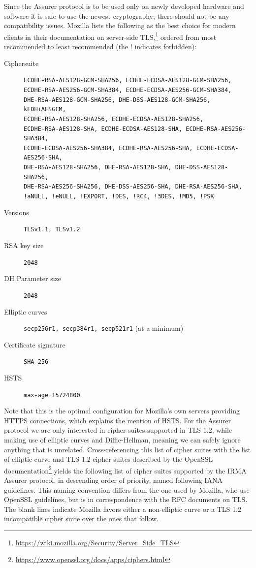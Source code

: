 Since the Assurer protocol is to be used only on newly developed hardware and software it is safe to use the newest cryptography; there should not be any compatibility issues. Mozilla lists the following as the best choice for modern clients in their documentation on server-side TLS,\footnote{\url{https://wiki.mozilla.org/Security/Server_Side_TLS}} ordered from most recommended to least recommended (the $!$ indicates forbidden):

\begin{description}
	\item [Ciphersuite] \texttt{ECDHE-RSA-AES128-GCM-SHA256, ECDHE-ECDSA-AES128-GCM-SHA256, \\
ECDHE-RSA-AES256-GCM-SHA384, ECDHE-ECDSA-AES256-GCM-SHA384, \\
DHE-RSA-AES128-GCM-SHA256, DHE-DSS-AES128-GCM-SHA256, kEDH+AESGCM, \\
ECDHE-RSA-AES128-SHA256, ECDHE-ECDSA-AES128-SHA256, \\
ECDHE-RSA-AES128-SHA, ECDHE-ECDSA-AES128-SHA, ECDHE-RSA-AES256-SHA384, \\
ECDHE-ECDSA-AES256-SHA384, ECDHE-RSA-AES256-SHA, ECDHE-ECDSA-AES256-SHA, \\
DHE-RSA-AES128-SHA256, DHE-RSA-AES128-SHA, DHE-DSS-AES128-SHA256, \\
DHE-RSA-AES256-SHA256, DHE-DSS-AES256-SHA, DHE-RSA-AES256-SHA, \\
!aNULL, !eNULL, !EXPORT, !DES, !RC4, !3DES, !MD5, !PSK}
  \item [Versions] \texttt{TLSv1.1, TLSv1.2}
  \item [RSA key size] \texttt{2048}
  \item [DH Parameter size] \texttt{2048}
  \item [Elliptic curves] \texttt{secp256r1, secp384r1, secp521r1} (at a minimum)
  \item [Certificate signature] \texttt{SHA-256}
  \item [HSTS] \texttt{max-age=15724800}
\end{description}

Note that this is the optimal configuration for Mozilla's own servers providing HTTPS connections, which explains the mention of HSTS. For the Assurer protocol we are only interested in cipher suites supported in TLS 1.2, while making use of elliptic curves and Diffie-Hellman, meaning we can safely ignore anything that is unrelated. Cross-referencing this list of cipher suites with the list of elliptic curve and TLS 1.2 cipher suites described by the OpenSSL documentation\footnote{\url{https://www.openssl.org/docs/apps/ciphers.html}} yields the following list of cipher suites supported by the IRMA Assurer protocol, in descending order of priority, named following IANA guidelines. This naming convention differs from the one used by Mozilla, who use OpenSSL guidelines, but is in correspondence with the RFC documents on TLS. The blank lines indicate Mozilla favors either a non-elliptic curve or a TLS 1.2 incompatible cipher suite over the ones that follow. 


